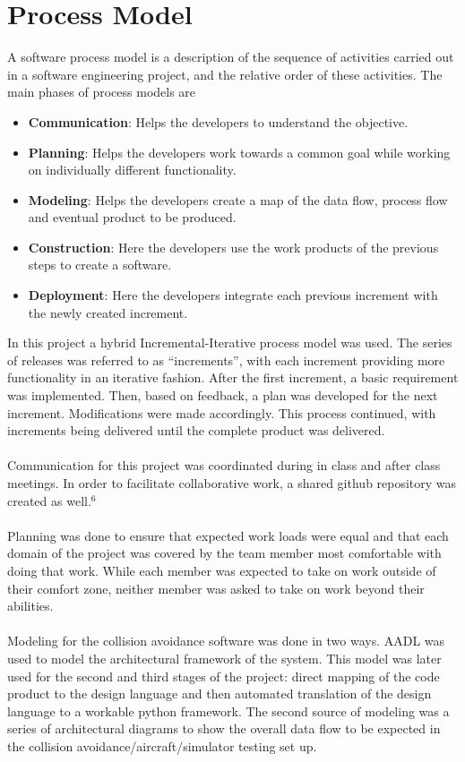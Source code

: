 \documentclass[12pt]{report}
\theoremstyle{plain}
\theoremstyle{definition}
\begin{document}
\section*{Process Model}
A software process model is a description of the sequence of activities carried out in a software engineering project, and the relative order of these activities.
The main phases of process models are 
\begin{itemize}
\item \textbf{Communication}: Helps the developers to understand the objective.
\item \textbf{Planning}: Helps the developers work towards a common goal while working on individually different functionality.
\item \textbf{Modeling}: Helps the developers create a map of the data flow, process flow and eventual product to be produced.
\item \textbf{Construction}: Here the developers use the work products of the previous steps to create a software.
\item \textbf{Deployment}: Here the developers integrate each previous increment with the newly created increment.
\end{itemize}
In this project a hybrid Incremental-Iterative process model was used.  The series of releases was referred to as “increments”, with each increment providing more functionality in an iterative fashion. After the first increment, a basic requirement was implemented. Then, based on feedback, a plan was developed for the next increment. Modifications were made accordingly. This process continued, with increments being delivered until the complete product was delivered.\\
\\
Communication for this project was coordinated during in class and after class meetings.  In order to facilitate collaborative work, a shared github repository was created as well.$^{6}$\\
\\
Planning was done to ensure that expected work loads were equal and that each domain of the project was covered by the team member most comfortable with doing that work.  While each member was expected to take on work outside of their comfort zone, neither member was asked to take on work beyond their abilities.\\
\\
Modeling for the collision avoidance software was done in two ways.  AADL was used to model the architectural framework of the system.  This model was later used for the second and third stages of the project: direct mapping of the code product to the design language and then automated translation of the design language to a workable python framework.  The second source of modeling was a series of architectural diagrams to show the overall data flow to be expected in the collision avoidance/aircraft/simulator testing set up.
\end{document}
